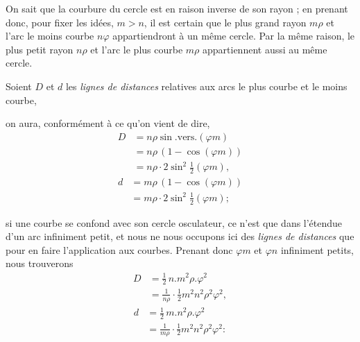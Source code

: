 \documentclass[11pt,a4paper]{article}
\begin{document}
On sait que la courbure du cercle est en raison inverse de son rayon ; en
prenant donc, pour fixer les idées, $m > n$, il est certain que le plus
grand rayon $m\rho$ et l'arc le moins courbe $n\varphi$ appartiendront à un
même cercle. Par la même raison, le plus petit rayon $n\rho$ et l'arc le
plus courbe $m\rho$ appartiennent aussi au même cercle.


Soient $D$ et $d$ les \emph{lignes de distances} relatives aux arcs le plus
courbe et le moins courbe,

on aura, conformément à ce qu'on vient de dire,
\begin{align*}
  D &= n\rho \sin.\text{vers.}(\varphi m)\\
    &= n\rho\,(1 - \cos(\varphi m))\\
    &= n\rho \cdot 2\sin^{2}\tfrac{1}{2}(\varphi m) ,
\end{align*}
\begin{align*}
  d &= m\rho\,(1 - \cos(\varphi m))\\
    &= m\rho \cdot 2\sin^{2}\tfrac{1}{2}(\varphi m) ;
\end{align*}


si une courbe se confond avec son cercle osculateur, ce n'est que dans
l'étendue d'un arc infiniment petit, et nous ne nous occupons ici des
\emph{lignes de distances} que pour en faire l'application aux courbes.
Prenant donc $\varphi m$ et $\varphi n$ infiniment petits, nous trouverons
\begin{align*}
  D &= \tfrac{1}{2}\,n.m^{2}\rho.\varphi^{2}\\
    &= \frac{1}{n\rho}\cdot\tfrac{1}{2}m^{2}n^{2}\rho^{2}\varphi^{2} ,
\end{align*}
\begin{align*}
  d &= \tfrac{1}{2}\,m.n^{2}\rho.\varphi^{2}\\
    &= \frac{1}{m\rho}\cdot\tfrac{1}{2}m^{2}n^{2}\rho^{2}\varphi^{2} :
\end{align*}
\end{document}
